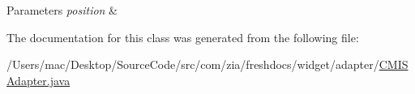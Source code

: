\begin{DoxyParams}{Parameters}
{\em position} & \\
\hline
\end{DoxyParams}


The documentation for this class was generated from the following file\-:\begin{DoxyCompactItemize}
\item 
/\-Users/mac/\-Desktop/\-Source\-Code/src/com/zia/freshdocs/widget/adapter/\hyperlink{_c_m_i_s_adapter_8java}{C\-M\-I\-S\-Adapter.\-java}\end{DoxyCompactItemize}
